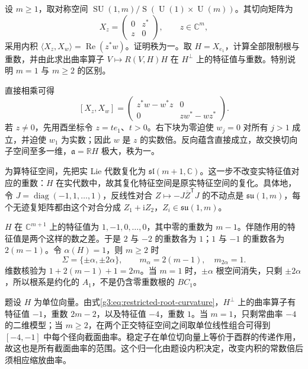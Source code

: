 \begin{optionalexercise}\label{g3:ex:complex-hyperbolic-restricted-roots}
	设 \(m\ge1\)，取对称空间 \(\operatorname{SU}(1,m)/\operatorname S(\operatorname U(1)\times\operatorname U(m))\)。其切向矩阵为
	\[
		X_z=\begin{pmatrix}0&z^*\\z&0\end{pmatrix},\qquad z\in\mathbb C^m,
	\]
	采用内积 \(\langle X_z,X_w\rangle=\operatorname{Re}(z^*w)\)。证明秩为一。取 \(H=X_{e_1}\)，计算全部限制根与重数，并由此求出曲率算子 \(V\mapsto R(V,H)H\) 在 \(H^\perp\) 上的特征值与重数。特别说明 \(m=1\) 与 \(m\ge2\) 的区别。
\end{optionalexercise}
\begin{solution}
	直接相乘可得
	\[
		[X_z,X_w]=\begin{pmatrix}z^*w-w^*z&0\\0&zw^*-wz^*\end{pmatrix}.
	\]
	若 \(z\ne0\)，先用酉坐标令 \(z=te_1\)、\(t>0\)。右下块为零迫使 \(w_j=0\) 对所有 \(j>1\) 成立，并迫使 \(w_1\) 为实数；因此 \(w\) 是 \(z\) 的实数倍。反向蕴含直接成立，故交换切向子空间至多一维，\(\mathfrak a=\mathbb RH\) 极大，秩为一。

	为算特征空间，先把实 Lie 代数复化为 \(\mathfrak{sl}(m+1,\mathbb C)\)。这一步不改变实特征值对应的重数：\(H\) 在实代数中，故其复化特征空间是原实特征空间的复化。具体地，令 \(J=\operatorname{diag}(-1,1,\ldots,1)\)，反线性对合 \(Z\mapsto-J\overline Z^{\mathsf T}J\) 的不动点是 \(\mathfrak{su}(1,m)\)，每个无迹复矩阵都由这个对合分成 \(Z_1+\mathrm iZ_2\)，\(Z_i\in\mathfrak{su}(1,m)\)。

	\(H\) 在 \(\mathbb C^{m+1}\) 上的特征值为 \(1,-1,0,\ldots,0\)，其中零的重数为 \(m-1\)。伴随作用的特征值是两个这样的数之差。于是 \(2\) 与 \(-2\) 的重数各为 \(1\)；\(1\) 与 \(-1\) 的重数各为 \(2(m-1)\)。令 \(\alpha(H)=1\)，则 \(m\ge2\) 时
	\[
		\Sigma=\{\pm\alpha,\pm2\alpha\},\qquad
		m_\alpha=2(m-1),\quad m_{2\alpha}=1.
	\]
	维数核验为 \(1+2(m-1)+1=2m\)。当 \(m=1\) 时，\(\pm\alpha\) 根空间消失，只剩 \(\pm2\alpha\)，所以根系是约化的 \(A_1\)，不是仍含零重数根的 \(BC_1\)。

	题设 \(H\) 为单位向量。由式\eqref{g3:eq:restricted-root-curvature}，\(H^\perp\) 上的曲率算子有特征值 \(-1\)，重数 \(2m-2\)，以及特征值 \(-4\)，重数 \(1\)。当 \(m=1\)，只剩常曲率 \(-4\) 的二维模型；当 \(m\ge2\)，在两个正交特征空间之间取单位线性组合可得到 \([-4,-1]\) 中每个径向截面曲率。稳定子在单位切向量上等价于酉群的传递作用，故这也是所有截面曲率的范围。这个归一化由题设内积决定，改变内积的常数倍后须相应缩放曲率。
\end{solution}

